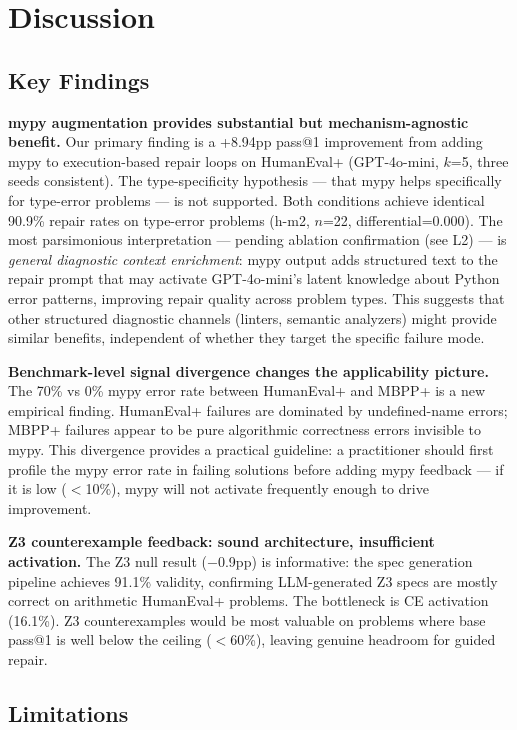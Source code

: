 \section{Discussion}

\subsection{Key Findings}

\textbf{mypy augmentation provides substantial but mechanism-agnostic benefit.}
Our primary finding is a +8.94pp pass@1 improvement from adding mypy to
execution-based repair loops on HumanEval+ (GPT-4o-mini, $k$=5, three seeds
consistent). The type-specificity hypothesis --- that mypy helps specifically
for type-error problems --- is not supported. Both conditions achieve identical
90.9\% repair rates on type-error problems (h-m2, $n$=22, differential=0.000).
The most parsimonious interpretation --- pending ablation confirmation (see L2)
--- is \emph{general diagnostic context enrichment}: mypy output adds structured
text to the repair prompt that may activate GPT-4o-mini's latent knowledge about
Python error patterns, improving repair quality across problem types. This
suggests that other structured diagnostic channels (linters, semantic analyzers)
might provide similar benefits, independent of whether they target the specific
failure mode.

\textbf{Benchmark-level signal divergence changes the applicability picture.}
The 70\% vs 0\% mypy error rate between HumanEval+ and MBPP+ is a new empirical
finding. HumanEval+ failures are dominated by undefined-name errors; MBPP+
failures appear to be pure algorithmic correctness errors invisible to mypy.
This divergence provides a practical guideline: a practitioner should first
profile the mypy error rate in failing solutions before adding mypy feedback ---
if it is low ($<$10\%), mypy will not activate frequently enough to drive
improvement.

\textbf{Z3 counterexample feedback: sound architecture, insufficient activation.}
The Z3 null result ($-$0.9pp) is informative: the spec generation pipeline
achieves 91.1\% validity, confirming LLM-generated Z3 specs are mostly correct
on arithmetic HumanEval+ problems. The bottleneck is CE activation (16.1\%).
Z3 counterexamples would be most valuable on problems where base pass@1 is
well below the ceiling ($<$60\%), leaving genuine headroom for guided repair.

\subsection{Limitations}


